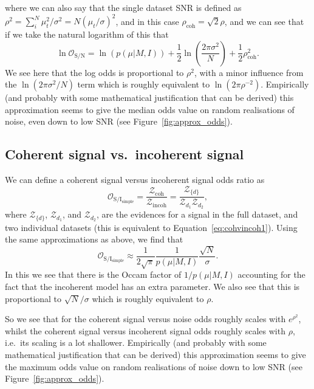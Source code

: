 where we can also say that the single dataset SNR is defined as $\rho^2 = \sum_i^N \mu_t^2/\sigma^2 = N\left(\mu_t/\sigma\right)^2$, and in this case
$\rho_{\text{coh}} = \sqrt{2}\rho$, and we can see that if we take the natural logarithm of this that
\begin{equation}
\ln{\mathcal{O}_{\text{S}/\text{N}}} = \ln{\left(p(\mu|M,I)\right)} + \frac{1}{2}\ln{\left(\frac{2\pi\sigma^2}{N}\right)} + \frac{1}{2}\rho_{\text{coh}}^2.
\end{equation}
We see here that the log odds is proportional to $\rho^2$, with a minor influence from the $\ln{\left(2\pi\sigma^2/N\right)}$ term which is roughly equivalent
to $\ln{\left(2\pi\rho^{-2}\right)}$. Empirically (and probably with some mathematical justification that can be derived) this approximation seems to give the
median odds value on random realisations of noise, even down to low SNR (see Figure~\ref{fig:approx_odds}).

\subsection{Coherent signal vs.\ incoherent signal}

We can define a coherent signal versus incoherent signal odds ratio as
\begin{equation}
\mathcal{O}_{\text{S}/\text{I}_{\text{simple}}} = \frac{\mathcal{Z}_{\text{coh}}}{\mathcal{Z}_{\text{incoh}}} = \frac{\mathcal{Z}_{\{d\}}}{\mathcal{Z}_{d_1}\mathcal{Z}_{d_2}},
\end{equation}
where $\mathcal{Z}_{\{d\}}$, $\mathcal{Z}_{d_1}$, and $\mathcal{Z}_{d_2}$, are the evidences for a signal in the full dataset, and two individual
datasets (this is equivalent to Equation~\ref{eq:cohvincoh1}). Using the same approximations as above, we find that
\begin{equation}
\mathcal{O}_{\text{S}/\text{I}_{\text{simple}}} \approx \frac{1}{2\sqrt{\pi}}\frac{1}{p(\mu|M,I)}\frac{\sqrt{N}}{\sigma}.
\end{equation}
In this we see that there is the Occam factor of $1/p(\mu|M,I)$ accounting for the fact that the incoherent model has an extra parameter. We also see that this is
proportional to $\sqrt{N}/\sigma$ which is roughly equivalent to $\rho$.

So we see that for the coherent signal versus noise odds roughly scales with $e^{\rho^2}$, whilst the coherent signal versus incoherent signal odds roughly scales with
$\rho$, i.e.\ its scaling is a lot shallower. Empirically (and probably with some mathematical justification that can be derived) this approximation seems to give the
maximum odds value on random realisations of noise down to low SNR (see Figure~\ref{fig:approx_odds}).

